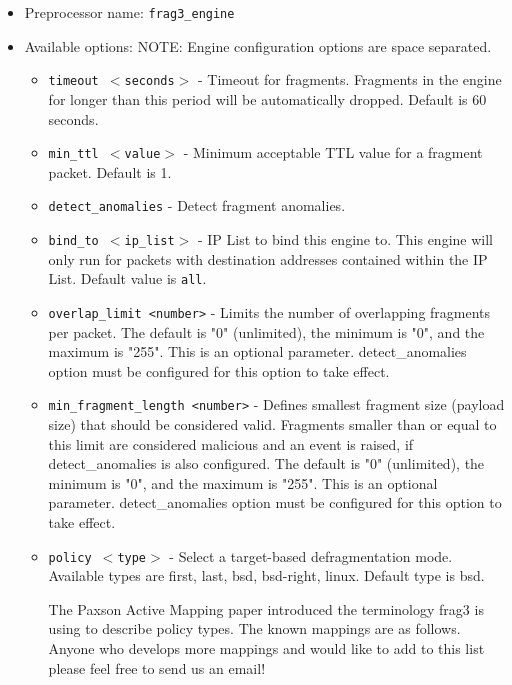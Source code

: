 \documentclass[english]{report}
\begin{document}
\begin{itemize}

\item Preprocessor name: \texttt{frag3\_engine}

\item Available options:
  NOTE: Engine configuration options are space separated.

\begin{itemize}

\item \texttt{timeout $<$seconds$>$} - Timeout for fragments.  Fragments in the
engine for longer than this period will be automatically dropped.  Default is
60 seconds.
                        
\item \texttt{min\_ttl $<$value$>$} - Minimum acceptable TTL value for a
fragment packet.  Default is 1.
                       
\item \texttt{detect\_anomalies} - Detect fragment anomalies.
     
\item \texttt{bind\_to $<$ip\_list$>$} - IP List to bind this engine to.  This
engine will only run for packets with destination addresses contained within
the IP List.  Default value is \texttt{all}.
                         
\item \texttt{overlap\_limit <number>} - Limits the number of overlapping
fragments per packet.  The default is "0" (unlimited), the minimum is "0", and
the maximum is "255". This is an optional parameter. detect\_anomalies option
must be configured for this option to take effect.

\item \texttt{min\_fragment\_length <number>} - Defines smallest fragment size
(payload size) that should be considered valid.  Fragments smaller than or
equal to this limit are considered malicious and an event is raised, if
detect\_anomalies is also configured.  The default is "0" (unlimited), the
minimum is "0", and the maximum is "255".  This is an optional parameter.
detect\_anomalies option must be configured for this option to take effect.

\item \texttt{policy $<$type$>$} - Select a target-based defragmentation mode.
Available types are first, last, bsd, bsd-right, linux.  Default type is bsd.

The Paxson Active Mapping paper introduced the terminology frag3 is using to
describe policy types.  The known mappings are as follows.  Anyone who develops
more mappings and would like to add to this list please feel free to send us an
email!


\end{itemize}
\end{itemize}
\end{document}
